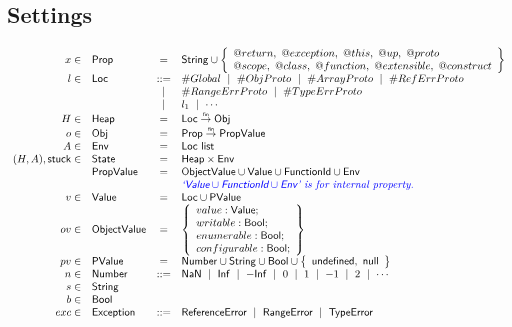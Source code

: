 \documentclass{article}
\makeatletter
\newcommand{\SF}[1]{\mbox{\textsf{#1}}}
\newcommand{\listd}{\ \SF{list}}
\newcommand{\Heap}{\SF{Heap}}
\newcommand{\Loc}{\SF{Loc}}
\newcommand{\Prop}{\SF{Prop}}
\newcommand{\Obj}{\SF{Obj}}
\newcommand{\State}{\SF{State}}
\newcommand{\Value}{\SF{Value}}
\newcommand{\PValue}{\SF{PValue}}
\newcommand{\finto}{\stackrel{\tiny \SF{fin}}{\rightarrow}}
\newcommand{\set}[1]{\left\{\begin{array}{l}#1\end{array}\right\}}
\newcommand{\fid}{\SF{FunctionId}}
\newcommand{\exc}[1]{{\sf #1}}
\newcommand{\varloc}[1]{\##1}
\newcommand{\varprop}[1]{@#1}
\def\inblue{\color{blue}}
\makeatother
\begin{document}
\subsection{Settings}
\[
\begin{array}{rlcl}
x \in & \Prop & =  & \SF{String} \cup
                       \set{
                         \varprop{return},\ \varprop{exception},\ \varprop{this},\
                         \varprop{up},\ \varprop{proto}\\
                         \varprop{scope},\ \varprop{class},\
                         \varprop{function},\ \varprop{extensible},\ \varprop{construct}
                       }\\
l \in & \Loc  & ::= & %
               \varloc{Global}
               ~\mid~ \varloc{ObjProto}
               ~\mid~ \varloc{ArrayProto}
               ~\mid~ \varloc{RefErrProto} \\
&&             \mid & \varloc{RangeErrProto}
               ~\mid~ \varloc{TypeErrProto}\\

&     & \mid  & l_1 ~\mid~ \cdots \\
H \in & \Heap & =  & \Loc \finto \Obj \\
o \in & \Obj  & =  & \Prop \finto \SF{PropValue} \\
A \in & \SF{Env} & = & \Loc\listd \\
(H,A), \SF{stuck} \in & \State & = & \Heap \times \SF{Env} \\
      & \SF{PropValue} & = & \SF{ObjectValue} \cup \Value \cup \fid \cup \SF{Env} \\
      &       &    & \inblue \textit{`$\Value\cup \fid\cup \SF{Env}$' is for internal property.} \\
v \in & \Value & = & \Loc \cup \PValue \\
ov \in& \SF{ObjectValue} & = & \set{
                                   value: \Value; \\
                                   writable: \SF{Bool}; \\
                                   enumerable: \SF{Bool}; \\
                                   configurable: \SF{Bool}; \\
                                 } \\
pv\in & \PValue& = & \SF{Number}
                     \cup \SF{String}
                     \cup \SF{Bool}
                     \cup \set{\SF{undefined},\ \SF{null}} \\
n \in & \SF{Number} & ::= & \SF{NaN} ~\mid~ \SF{Inf} ~\mid~ -\SF{Inf} ~\mid~ 0 ~\mid~ 1 ~\mid~ -1 ~\mid~ 2 ~\mid~\cdots\\
s \in & \SF{String}\\
b \in & \SF{Bool} \\
exc \in & \SF{Exception} & ::= & \exc{ReferenceError} ~\mid~ \exc{RangeError} ~\mid~ \exc{TypeError}
\end{array}
\]
\end{document}
